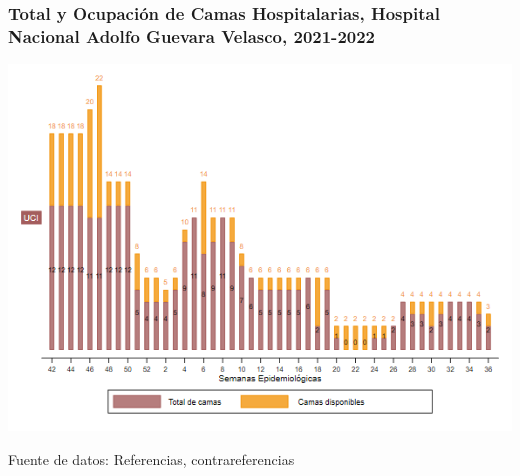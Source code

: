 \documentclass[xcolor=table]{beamer}
\begin{document}
	\begin{frame}
		\frametitle{Total y Ocupación de Camas Hospitalarias, Hospital Nacional Adolfo Guevara Velasco, 2021-2022}
		\vspace{-.2cm}
		\begin{center}
			\includegraphics[width=0.77\linewidth, trim={0cm .5cm 0cm 0.2cm},clip]{../figuras/h_adolfo_uci.png}
		\end{center}
		{\tiny Fuente de datos: Referencias, contrareferencias}
	\end{frame}
\end{document}
